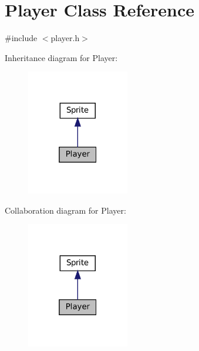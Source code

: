 \hypertarget{classPlayer}{}\section{Player Class Reference}
\label{classPlayer}


{\ttfamily \#include $<$player.\+h$>$}



Inheritance diagram for Player\+:
\nopagebreak
\begin{figure}[H]
\begin{center}
\leavevmode
\includegraphics[width=127pt]{classPlayer__inherit__graph}
\end{center}
\end{figure}


Collaboration diagram for Player\+:
\nopagebreak
\begin{figure}[H]
\begin{center}
\leavevmode
\includegraphics[width=127pt]{classPlayer__coll__graph}
\end{center}
\end{figure}
